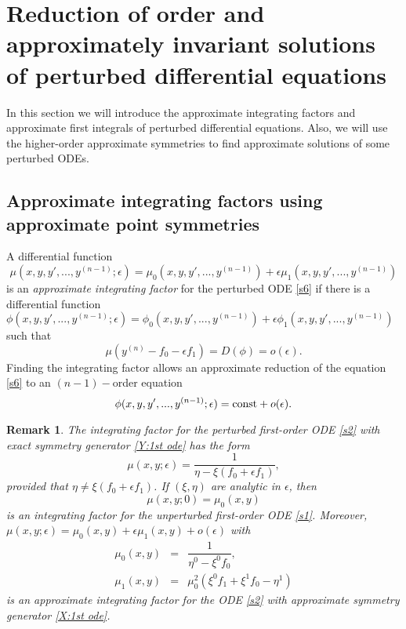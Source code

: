 \documentclass[11pt,letter,subeqn]{article}
\def\const{\hbox{\rm const}}
\newtheorem{remark}{Remark}[section]
\begin{document}
\section{Reduction of order and approximately invariant solutions of perturbed differential equations}\label{sec:sols}
In this section we will introduce the approximate integrating factors and approximate first integrals of perturbed differential equations. Also, we will use the higher-order approximate symmetries to find approximate solutions of some perturbed ODEs.
\subsection{Approximate integrating factors using approximate point symmetries}
  A differential function
  \begin{equation}\label{IF0}
    \mu(x,y,y',...,y^{(n-1)};\epsilon)=\mu_0(x,y,y',...,y^{(n-1)})+\epsilon \mu_1(x,y,y',...,y^{(n-1)})
  \end{equation}
  is an \textit{\textrm{approximate integrating factor}} for the perturbed ODE \eqref{s6} if there is a differential function \, $\phi(x,y,y',...,y^{(n-1)};\epsilon)=\phi_0(x,y,y',...,y^{(n-1)})+\epsilon \phi_1(x,y,y',...,y^{(n-1)})$ such that
  \[
    \mu(y^{(n)}-f_0-\epsilon f_1)=D(\phi)=o(\epsilon).
  \]
Finding the integrating factor allows an approximate reduction of the equation \eqref{s6} to an $(n-1)-$order equation
\begin{equation}\label{IF1}
  \phi(x,y,y',...,y^{(n-1)};\epsilon)=\const+o(\epsilon).
\end{equation}
\begin{remark}
  The integrating factor for the perturbed first-order ODE \eqref{s2} with exact symmetry generator \eqref{Y:1st ode} has the form
  \begin{equation}\label{IF_pert ode}
    \mu(x,y;\epsilon)=\dfrac{1}{\eta-\xi(f_0+\epsilon f_1)},
  \end{equation}
  provided that $\eta \neq \xi(f_0+\epsilon f_1)$. If $(\xi,\eta)$ are analytic in $\epsilon$, then
  \[
    \mu(x,y;0)=\mu_0(x,y)
  \]
  is an integrating factor for the unperturbed first-order ODE \eqref{s1}. Moreover, $\mu(x,y;\epsilon)=\mu_0(x,y)+\epsilon \mu_1(x,y)+o(\epsilon)$ with
  \begin{subequations}\label{approx_IF}
     \begin{eqnarray}
    \mu_0(x,y) &=& \dfrac{1}{\eta^0-\xi^0 f_0}, \\
    \mu_1(x,y) &=& {\mu_0^2}\left(\xi^0 f_1+\xi^1 f_0-\eta^1 \right)
  \end{eqnarray}
  \end{subequations}
is an approximate integrating factor for the ODE \eqref{s2} with approximate symmetry generator \eqref{X:1st ode}.
\end{remark}
\end{document}
